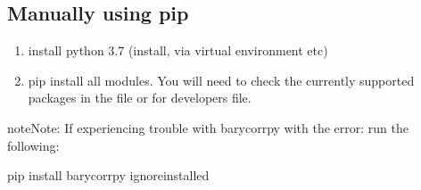 \documentclass[a4paper,10pt,english]{report}
\begin{document}
\subsection{Manually using pip}
\label{\detokenize{misc/pythoninstallation:manually-using-pip}}\label{\detokenize{misc/pythoninstallation:python-install-pip}}\begin{enumerate}
%
\item {} 
install python 3.7 (install, via virtual environment etc)

\item {} 
pip install all modules. You will need to check the
currently supported packages in the  file
or for developers  file.
\begin{quote}

\begin{sphinxVerbatim}[commandchars=\\\{\}]
  
  
\end{sphinxVerbatim}
\end{quote}

\end{enumerate}

\begin{sphinxadmonition}{note}{Note:}
If experiencing trouble with barycorrpy with the error:
 run the following:

\begin{sphinxVerbatim}[commandchars=\\\{\}]
pip install barycorrpy \PYGZhy{}\PYGZhy{}ignore\PYGZhy{}installed
\end{sphinxVerbatim}
\end{sphinxadmonition}
\end{document}
